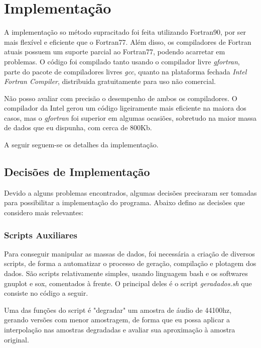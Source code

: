 \section{Implementação}

A implementação so método supracitado foi feita utilizando Fortran90, por ser mais flexível e eficiente que o Fortran77. Além disso, os compiladores de Fortran atuais possuem um suporte parcial ao Fortran77, podendo acarretar em problemas. O código foi compilado tanto usando o compilador livre \emph{gfortran}, parte do pacote de compiladores livres \emph{gcc}, quanto na plataforma fechada \emph{Intel Fortran Compiler}, distribuida gratuitamente para uso não comercial.

Não posso avaliar com precisão o desempenho de ambos os compiladores. O compilador da Intel gerou um código ligeiramente mais eficiente na maiora dos casos, mas o \emph{gfortran} foi superior em algumas ocasiões, sobretudo na maior massa de dados que eu dispunha, com cerca de 800Kb.

A seguir seguem-se os detalhes da implementação.

\subsection{Decisões de Implementação}

Devido a alguns problemas encontrados, algumas decisões precisaram ser tomadas para possibilitar a implementação do programa. Abaixo defino as decisões que considero mais relevantes:

\subsubsection{Scripts Auxiliares}

Para conseguir manipular as massas de dados, foi necessária a criação de diversos scripts, de forma a automatizar o processo de geração, compilação e plotagem dos dados. São scripts relativamente simples, usando linguagem bash e os softwares gnuplot e sox, comentados à frente.  O principal deles é o script \textit{geradados.sh} que consiste no código a seguir.

Uma das funções do script é "degradar" um amostra de áudio de 44100hz, gerando versões com menor amostragem, de forma que eu possa aplicar a interpolação nas amostras degradadas e avaliar sua aproximação à amostra original.

\clearpage
\lstset{language=bash}

